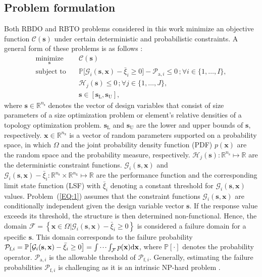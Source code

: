 \documentclass[preprint,3p]{elsarticle}
\begin{document}
\begin{linenumbers}
\subsection{Problem formulation}\label{SUBSEC:21}
Both RBDO and RBTO problems considered in this work minimize an objective function $\mathcal{C}(\textbf{s})$ under certain deterministic and probabilistic constraints. A general form of these problems is as follows \cite{VANHUYNH2023}:
\begin{equation}
    \begin{aligned}
        \underset{\textbf{s}}{\text{minimize}} \quad & \mathcal{C}(\textbf{s})\\
        \text{subject to} \quad &
        \mathbb{P}\bigl[\mathcal{G}_i(\textbf{s},\textbf{x})-\bar{\xi}_i \geq 0\bigr]-\mathcal{P}_{\text{a},i} \leq 0 \,; \forall i \in \{1,\dots,I\},\\
        & \mathcal{H}_j(\textbf{s}) \leq 0 \,; \forall j \in \{1,\dots,J\},\\
        &\textbf{s} \in [\textbf{s}_\text{L},\textbf{s}_\text{U}],
    \end{aligned}
    \label{EQ:1}
\end{equation}
where $\textbf{s}\in\mathbb{R}^{n_\text{s}}$ denotes the vector of design variables that consist of size parameters of a size optimization problem or element’s relative densities of a topology optimization problem.
$\textbf{s}_\text{L}$ and $\textbf{s}_\text{U}$ are the lower and upper bounds of $\textbf{s}$, respectively.
$\textbf{x}\in\mathbb{R}^{n_\text{x}}$ is a vector of random parameters supported on a probability space, in which $\Omega$ and the joint probability density function (PDF) $p(\textbf{x})$ are the random space and the probability measure, respectively.  $\mathcal{H}_j(\textbf{s}): \mathbb{R}^{n_\text{s}} \mapsto \mathbb{R}$ are the
deterministic constraint functions. $\mathcal{G}_i(\textbf{s},\textbf{x})$
and $\mathcal{G}_i(\textbf{s},\textbf{x})-\bar{\xi}_i: \mathbb{R}^{n_\text{s}} \times
\mathbb{R}^{n_\text{x}} \mapsto \mathbb{R}$ are the performance function and the corresponding limit state function (LSF) with $\bar{\xi}_i$ denoting a constant threshold for $\mathcal{G}_i(\textbf{s},\textbf{x})$ values.
Problem~(\ref{EQ:1}) assumes that the constraint functions $\mathcal{G}_i(\textbf{s},\textbf{x})$ are conditionally independent given the design variable vector $\textbf{s}$.
If the response value exceeds its threshold, the structure is then determined non-functional. Hence, the domain $\mathcal{F}=
\left\{\textbf{x} \in \Omega|\mathcal{G}_i(\textbf{s},\textbf{x})-\bar{\xi}_i
\geq 0\right\}$ is considered a failure domain for a specific $\textbf{s}$. This domain corresponds to the failure probability $\mathcal{P}_{\text{f}, i} = \mathbb{P}\bigl[\mathcal{G}_i(\textbf{s},\textbf{x})-\bar{\xi}_i\geq 0\bigr] = \idotsint_\mathcal{F} p(\textbf{x})\mathrm{d}\textbf{x}$, where $\mathbb{P}[\cdot]$ denotes the probability operator. $\mathcal{P}_{\text{a},i}$ is the allowable threshold of $\mathcal{P}_{\text{f},i}$. Generally, estimating the failure probabilities $\mathcal{P}_{\text{f}, i}$ is challenging as it is an intrinsic NP-hard problem \cite{VANHUYNH2023, Do2021b}. 


\end{linenumbers}
\end{document}
